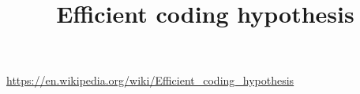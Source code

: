 \documentclass[a4paper]{standalone}
\title{Efficient coding hypothesis}
\begin{document}
    \maketitle
    \url{https://en.wikipedia.org/wiki/Efficient_coding_hypothesis}
\end{document}
